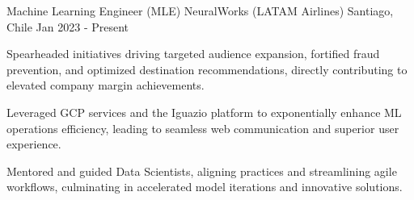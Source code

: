   \cventry
  {Machine Learning Engineer (MLE)}
  {NeuralWorks (LATAM Airlines)}
  {Santiago, Chile}
  {Jan 2023 - Present}
  {
  \begin{cvitems} %
    \item Spearheaded initiatives driving targeted audience expansion, fortified fraud prevention, and optimized destination recommendations, directly contributing to elevated company margin achievements.
    \item Leveraged GCP services and the Iguazio platform to exponentially enhance ML operations efficiency, leading to seamless web communication and superior user experience.
    \item Mentored and guided Data Scientists, aligning practices and streamlining agile workflows, culminating in accelerated model iterations and innovative solutions.
  \end{cvitems}
  }

